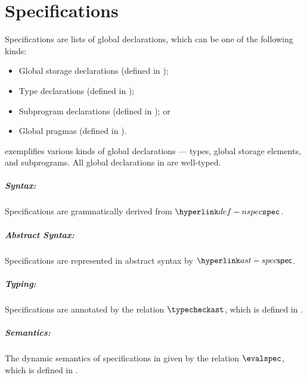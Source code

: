 \chapter{Specifications\label{chap:Specifications}}

\hypertarget{def-globaldeclarationterm}{}
Specifications are lists of global declarations,
which can be one of the following kinds:
\begin{itemize}
  \item Global storage declarations (defined in );
  \item Type declarations (defined in );
  \item Subprogram declarations (defined in ); or
  \item Global pragmas (defined in ).
\end{itemize}

 exemplifies various kinds of global declarations ---
types, global storage elements, and subprograms.
All global declarations in  are well-typed.

\ChapterOutline

\hypertarget{def-specificationterm}{}

\paragraph{Syntax:} Specifications are grammatically derived from $\Nspec$.
\paragraph{Abstract Syntax:} Specifications are represented in abstract syntax by $\spec$.
\paragraph{Typing:} Specifications are annotated by the relation $\typecheckast$, which is defined in
  .
\paragraph{Semantics:} The dynamic semantics of specifications in given by the relation $\evalspec$,
  which is defined in .


